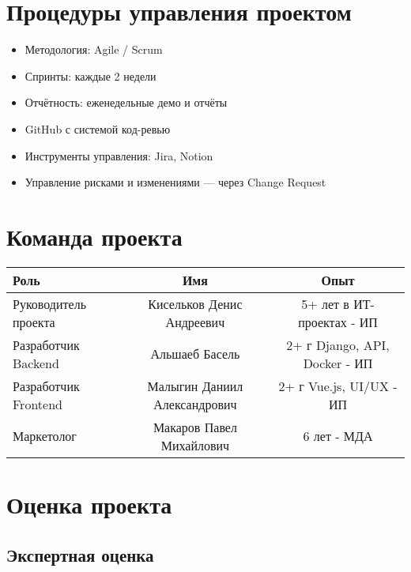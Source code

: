 \documentclass[14pt, russian]{matmex-diploma-custom}
\begin{document}
\section{Процедуры управления проектом}

\begin{itemize}[noitemsep]
    \item Методология: Agile / Scrum
    \item Спринты: каждые 2 недели
    \item Отчётность: еженедельные демо и отчёты
    \item GitHub с системой код-ревью
    \item Инструменты управления: Jira, Notion
    \item Управление рисками и изменениями — через Change Request
\end{itemize}


\section{Команда проекта}

{\footnotesize
\begin{longtable}
    \centering
    \begin{tabular}{|l|c|c|}
    \hline
    \textbf{Роль} & \textbf{Имя} & \textbf{Опыт} \\
    \hline
    Руководитель проекта & Кисельков Денис Андреевич & 5+ лет в ИТ-проектах - ИП \\
    \hline
    Разработчик Backend & Альшаеб Басель & 2+ г Django, API, Docker - ИП \\
    \hline
    Разработчик Frontend & Малыгин Даниил Александрович & 2+ г Vue.js, UI/UX - ИП \\
    \hline
    Маркетолог & Макаров Павел Михайлович & 6 лет - МДА \\
    \hline
    \end{tabular}

\end{longtable}
}

\section{Оценка проекта}

\subsection{Экспертная оценка}
\end{document}
